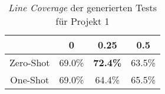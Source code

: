 \bgroup
\def\arraystretch{2}
\begin{table}[H]
	\vspace{.5cm}
	\centering		
	\begin{center}
		\begin{tabular}{|c||c|c|c|}
			\hline 
			& 0 & 0.25 & 0.5 \\
			\hline 
			\hline
			Zero-Shot & 69.0\% & \textbf{72.4\%} & 63.5\% \\
			\hline
			One-Shot & 69.0\% & 64.4\% & 65.5\% \\
			\hline
		\end{tabular} 
	\end{center}
	\caption{\textit{Line Coverage} der generierten Tests für Projekt 1}
	\label{fig:line-1}
	\vspace{-.8cm}
\end{table}
\egroup